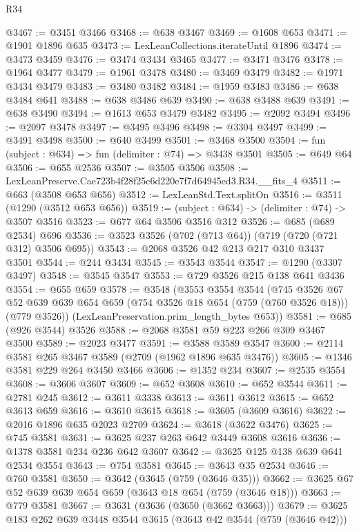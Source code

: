 \begin{lexlean}{R34}
\begin{coremodule}
@3467 := @3451 @3466
@3468 := @638 @3467
@3469 := @1608 @653
@3471 := @1901 @1896 @635
@3473 := LexLeanCollections.iterateUntil @1896
@3474 := @3473 @3459
@3476 := @3474 @3434 @3465
@3477 := @3471 @3476
@3478 := @1964 @3477
@3479 := @1961 @3478
@3480 := @3469 @3479
@3482 := @1971 @3434 @3479
@3483 := @3480 @3482
@3484 := @1959 @3483
@3486 := @638 @3484 @641
@3488 := @638 @3486 @639
@3490 := @638 @3488 @639
@3491 := @638 @3490
@3494 := @1613 @653 @3479 @3482
@3495 := @2092 @3494
@3496 := @2097 @3478
@3497 := @3495 @3496
@3498 := @3304 @3497
@3499 := @3491 @3498
@3500 := @640 @3499
@3501 := @3468 @3500
@3504 := fun (subject : @634) => fun (delimiter : @74) => @3438 @3501
@3505 := @649 @64
@3506 := @655 @2536
@3507 := @3505 @3506
@3508 := LexLeanPreserve.Cae723b4f28f25c6d220e7f7d64945ed3.R34.__fits_4
@3511 := @663 (@3508 @653 @656)
@3512 := LexLeanStd.Text.splitOn
@3516 := @3511 (@1290 (@3512 @653 @656))
@3519 := (subject : @634) -> (delimiter : @74) -> @3507 @3516
@3523 := @677 @64 @3506 @3516 @312
@3526 := @685 (@689 @2534) @696
@3536 := @3523 @3526 (@702 (@713 @64)) (@719 (@720 (@721 @312) @3506 @695))
@3543 := @2068 @3526 @42 @213 @217 @310 @3437 @3501
@3544 := @244 @3434
@3545 := @3543 @3544
@3547 := @1290 (@3307 @3497)
@3548 := @3545 @3547
@3553 := @729 @3526 @215 @138 @641 @3436
@3554 := @655 @659
@3578 := @3548
    (@3553
      @3554
      @3544
      (@745
        @3526
        @67
        @52
        @639
        @639
        @654
        @659
        (@754 @3526 @18 @654 (@759 (@760 @3526 @18)))
        (@779 @3526))
      (LexLeanPreservation.prim_length_bytes @653))
@3581 := @685 (@926 @3544) @3526
@3588 := @2068 @3581 @59 @223 @266 @309 @3467 @3500
@3589 := @2023 @3477
@3591 := @3588 @3589 @3547
@3600 := @2114 @3581 @265 @3467 @3589 (@2709 (@1962 @1896 @635 @3476))
@3605 := @1346 @3581 @229 @264 @3450 @3466
@3606 := @1352 @234
@3607 := @2535 @3554
@3608 := @3606 @3607
@3609 := @652 @3608
@3610 := @652 @3544
@3611 := @2781 @245
@3612 := @3611 @3338
@3613 := @3611 @3612
@3615 := @652 @3613 @659
@3616 := @3610 @3615
@3618 := @3605 (@3609 @3616)
@3622 := @2016 @1896 @635 @2023 @2709
@3624 := @3618 (@3622 @3476)
@3625 := @745 @3581
@3631 := @3625 @237 @263 @642 @3449 @3608 @3616
@3636 := @1378 @3581 @234 @236 @642 @3607
@3642 := @3625 @125 @138 @639 @641 @2534 @3554
@3643 := @754 @3581
@3645 := @3643 @35 @2534
@3646 := @760 @3581
@3650 := @3642 (@3645 (@759 (@3646 @35)))
@3662 := @3625 @67 @52 @639 @639 @654 @659 (@3643 @18 @654 (@759 (@3646 @18)))
@3663 := @779 @3581
@3667 := @3631 (@3636 (@3650 (@3662 @3663)))
@3679 := @3625 @183 @262 @639 @3448 @3544 @3615 (@3643 @42 @3544 (@759 (@3646 @42)))

\end{coremodule}
\end{lexlean}
